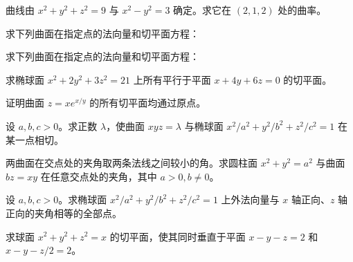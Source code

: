 \noindent\begin{minipage}{\textwidth}
曲线由 $x^2+y^2+z^2=9$ 与 $x^2-y^2=3$ 确定。求它在 $(2,1,2)$ 处的曲率。
\end{minipage}\par\vfill
\newpage
\noindent\begin{minipage}{\textwidth}
求下列曲面在指定点的法向量和切平面方程：
\end{minipage}\par\vfill
\noindent\begin{minipage}{\textwidth}
求下列曲面在指定点的法向量和切平面方程：
\end{minipage}\par\vfill
\noindent\begin{minipage}{\textwidth}
求椭球面 $x^2+2y^2+3z^2=21$ 上所有平行于平面 $x+4y+6z=0$ 的切平面。
\end{minipage}\par\vfill
\newpage
\noindent\begin{minipage}{\textwidth}
证明曲面 $z=xe^{x/y}$ 的所有切平面均通过原点。
\end{minipage}\par\vfill
\noindent\begin{minipage}{\textwidth}
设 $a,b,c>0$。求正数 $\lambda$，使曲面 $xyz=\lambda$ 与椭球面 $x^2/a^2+y^2/b^2+z^2/c^2=1$ 在某一点相切。
\end{minipage}\par\vfill
\noindent\begin{minipage}{\textwidth}
两曲面在交点处的夹角取两条法线之间较小的角。求圆柱面 $x^2+y^2=a^2$ 与曲面 $bz=xy$ 在任意交点处的夹角，其中 $a>0,b\ne0$。
\end{minipage}\par\vfill
\newpage
\noindent\begin{minipage}{\textwidth}
设 $a,b,c>0$。求椭球面 $x^2/a^2+y^2/b^2+z^2/c^2=1$ 上外法向量与 $x$ 轴正向、$z$ 轴正向的夹角相等的全部点。
\end{minipage}\par\vfill
\noindent\begin{minipage}{\textwidth}
求球面 $x^2+y^2+z^2=x$ 的切平面，使其同时垂直于平面 $x-y-z=2$ 和 $x-y-z/2=2$。
\end{minipage}\par\vfill
